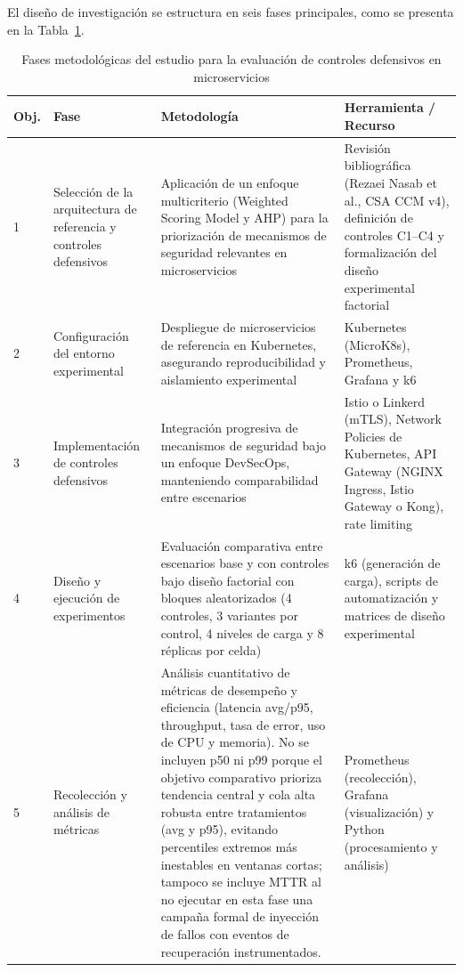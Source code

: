 El diseño de investigación se estructura en seis fases principales, como se presenta en la Tabla~\ref{tab:fases_metodologicas}.
\begin{table}[htbp]
\centering
\caption{Fases metodológicas del estudio para la evaluación de controles defensivos en microservicios}
\label{tab:fases_metodologicas}

\renewcommand{\arraystretch}{1.3}

\begin{tabular}{p{1cm} p{4cm} p{4.5cm} p{4.5cm}}
\hline
\textbf{Obj.} & \textbf{Fase} & \textbf{Metodología} & \textbf{Herramienta / Recurso} \\
\hline

1 
& Selección de la arquitectura de referencia y controles defensivos 
& Aplicación de un enfoque multicriterio (Weighted Scoring Model y AHP) para la priorización de mecanismos de seguridad relevantes en microservicios 
& Revisión bibliográfica (Rezaei Nasab et al., CSA CCM v4), definición de controles C1--C4 y formalización del diseño experimental factorial \\

2 
& Configuración del entorno experimental 
& Despliegue de microservicios de referencia en Kubernetes, asegurando reproducibilidad y aislamiento experimental 
& Kubernetes (MicroK8s), Prometheus, Grafana y k6 \\

3 
& Implementación de controles defensivos 
& Integración progresiva de mecanismos de seguridad bajo un enfoque DevSecOps, manteniendo comparabilidad entre escenarios 
& Istio o Linkerd (mTLS), Network Policies de Kubernetes, API Gateway (NGINX Ingress, Istio Gateway o Kong), rate limiting \\

4 
& Diseño y ejecución de experimentos 
& Evaluación comparativa entre escenarios base y con controles bajo diseño factorial con bloques aleatorizados (4 controles, 3 variantes por control, 4 niveles de carga y 8 réplicas por celda) 
& k6 (generación de carga), scripts de automatización y matrices de diseño experimental \\

5 
& Recolección y análisis de métricas 
& Análisis cuantitativo de métricas de desempeño y eficiencia (latencia avg/p95, throughput, tasa de error, uso de CPU y memoria). No se incluyen p50 ni p99 porque el objetivo comparativo prioriza tendencia central y cola alta robusta entre tratamientos (avg y p95), evitando percentiles extremos más inestables en ventanas cortas; tampoco se incluye MTTR al no ejecutar en esta fase una campaña formal de inyección de fallos con eventos de recuperación instrumentados. 
& Prometheus (recolección), Grafana (visualización) y Python (procesamiento y análisis) \\


\end{tabular}
\end{table}
